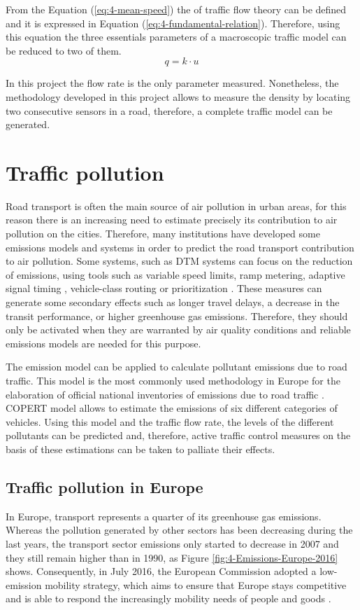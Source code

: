 \newpage
From the Equation (\ref{eq:4-mean-speed}) the  of traffic flow theory can be defined and it is expressed in Equation (\ref{eq:4-fundamental-relation}). Therefore, using this equation the three essentials parameters of a macroscopic traffic model can be reduced to two of them.
\begin{equation} \label{eq:4-fundamental-relation}
q = k \cdot u
\end{equation}

In this project the flow rate is the only parameter measured. Nonetheless, the methodology developed in this project allows to measure the density by locating two consecutive sensors in a road, therefore, a complete traffic model can be generated.


\section{Traffic pollution}
Road transport is often the main source of air pollution in urban areas, for this reason there is an increasing need to estimate precisely its contribution to air pollution on the cities. Therefore, many institutions have developed some emissions models and systems in order to predict the road transport contribution to air pollution. Some systems, such as \ac{DTM} systems can focus on the reduction of emissions, using tools such as variable speed limits, ramp metering, adaptive signal timing \cite{MK10}, vehicle-class routing or prioritization \cite{ZDHB09}. These measures can generate some secondary effects such as longer travel delays, a decrease in the transit performance, or higher greenhouse gas emissions. Therefore, they should only be activated when they are warranted by air quality conditions \cite{EMA09} and reliable emissions models are needed for this purpose. 

The  emission model \cite{NS16} can be applied to calculate pollutant emissions due to road traffic. This model is the most commonly used methodology in Europe for the elaboration of official national inventories of emissions due to road traffic \cite{Zaldei2017531}. COPERT model allows to estimate the emissions of six different categories of vehicles. Using this model and the traffic flow rate, the levels of the different pollutants can be predicted and, therefore, active traffic control measures on the basis of these estimations can be taken to palliate their effects.

\subsection{Traffic pollution in Europe}
In Europe, transport represents a quarter of its greenhouse gas emissions. Whereas the pollution generated by other sectors has been decreasing during the last years, the transport sector emissions only started to decrease in 2007 and they still remain higher than in 1990, as Figure \ref{fig:4-Emissions-Europe-2016} shows. Consequently, in July 2016, the European Commission adopted a low-emission mobility strategy, which aims to ensure that Europe stays competitive and is able to respond the increasingly mobility needs of people and goods \cite{EuStrat}. 

